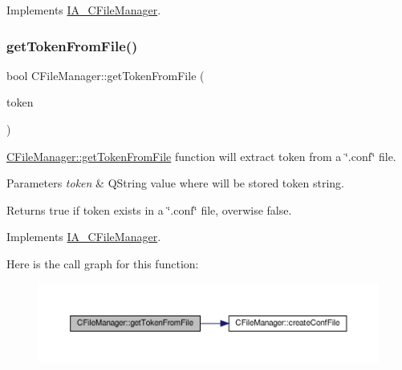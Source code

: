 Implements \hyperlink{classIA__CFileManager}{I\+A\+\_\+\+C\+File\+Manager}.

\mbox{\label{classCFileManager_a4021ce0a385bcf0068dff7161e96999d}} 
\subsubsection{\texorpdfstring{get\+Token\+From\+File()}{getTokenFromFile()}}
{\footnotesize\ttfamily bool C\+File\+Manager\+::get\+Token\+From\+File (\begin{DoxyParamCaption}\item[{Q\+String \&}]{token }\end{DoxyParamCaption})\hspace{0.3cm}{\ttfamily [virtual]}}



\hyperlink{classCFileManager_a4021ce0a385bcf0068dff7161e96999d}{C\+File\+Manager\+::get\+Token\+From\+File} function will extract token from a \char`\"{}.\+conf\char`\"{} file. 


\begin{DoxyParams}{Parameters}
{\em token} & Q\+String value where will be stored token string. \\
\hline
\end{DoxyParams}
\begin{DoxyReturn}{Returns}
true if token exists in a \char`\"{}.\+conf\char`\"{} file, overwise false. 
\end{DoxyReturn}


Implements \hyperlink{classIA__CFileManager}{I\+A\+\_\+\+C\+File\+Manager}.

Here is the call graph for this function\+:
\nopagebreak
\begin{figure}[H]
\begin{center}
\leavevmode
\includegraphics[width=350pt]{classCFileManager_a4021ce0a385bcf0068dff7161e96999d_cgraph}
\end{center}
\end{figure}
\mbox{\label{classCFileManager_a3478ad92b96489069a2ede4140de2ba6}} 
